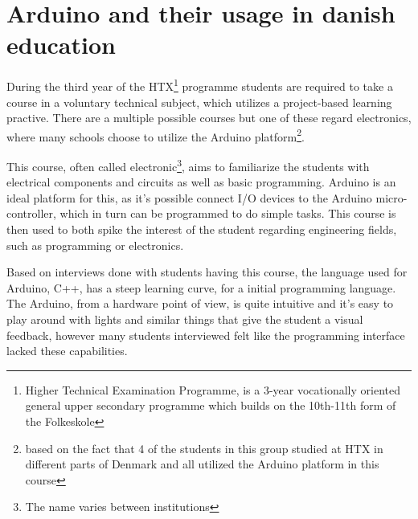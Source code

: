 % 

\section{Arduino and their usage in danish education}
During the third year of the HTX\footnote{Higher Technical Examination Programme, is a 3-year vocationally oriented general upper secondary programme which builds on the 10th-11th form of the Folkeskole\cite{htx_wiki}} programme students are required to take a course in a voluntary technical subject, which utilizes a project-based learning practive. 
There are a multiple possible courses but one of these regard electronics, where many schools choose to utilize the Arduino platform\footnote{based on the fact that 4 of the students in this group studied at HTX in different parts of Denmark and all utilized the Arduino platform in this course}\cite{holstebro_education}.  


This course, often called electronic\footnote{The name varies between institutions}, aims to familiarize the students with electrical components and circuits as well as basic programming.\cite{holstebro_electronic}
Arduino is an ideal platform for this, as it's possible connect I/O devices to the Arduino micro-controller, which in turn can be programmed to do simple tasks. 
This course is then used to both spike the interest of the student regarding engineering fields, such as programming or electronics. 


Based on interviews done with students having this course, the language used for Arduino, C++, has a steep learning curve, for a initial programming language.
The Arduino, from a hardware point of view, is quite intuitive and it's easy to play around with lights and similar things that give the student a visual feedback, however many students interviewed felt like the programming interface lacked these capabilities. 
\cite{Interviews}%


